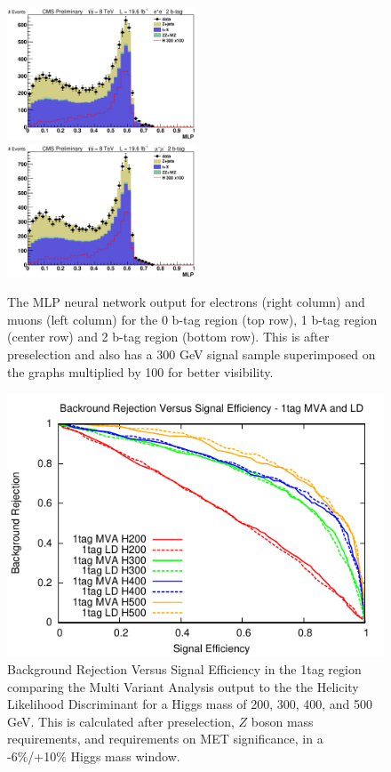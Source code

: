 \begin{figure}[htb!]
{  }
\centerline{
    \includegraphics[width=0.5\textwidth]{presentation/defense/images/preselection/2/el/MLP.eps}
    \includegraphics[width=0.5\textwidth]{presentation/defense/images/preselection/2/mu/MLP.eps}
  }
  \caption{
    The MLP neural network output for electrons (right column) and muons (left column) for the 0 b-tag region (top row), 1 b-tag region (center row) and 2 b-tag region (bottom row).  This is after preselection and also has a 300 GeV signal sample superimposed on the graphs multiplied by 100 for better visibility.
  }
  \label{fig:0tag_mlp}
\end{figure}






\begin{figure}[htb!]
\begin{center}
\centerline{
\includegraphics[width=0.6\linewidth]{Optimization/plots/NN/1tag_MVA_LD_ROC.pdf}
}
\caption{
Background Rejection Versus Signal Efficiency in the 1tag region comparing the Multi Variant Analysis output to the the Helicity Likelihood Discriminant for a Higgs mass of 200, 300, 400, and 500 GeV. This is calculated after preselection, $Z$ boson mass requirements, and requirements on MET significance, in a -6\%/+10\% Higgs mass window.
}
\label{fig:nn_1tag_ROC}
\end{center}
\end{figure}

